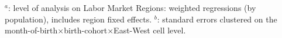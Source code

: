 \begin{landscape}
\begin{table}[htbp]
\begin{minipage}{0.73\linewidth}
		\hspace*{15 pt}$^a$: level of analysis on Labor Market Regions: weighted regressions (by population), includes region fixed effects.\newline
		\hspace*{15 pt}$^b$: standard errors clustered on the month-of-birth$\times$birth-cohort$\times$East-West cell level.
	\end{minipage}
\end{table} 
	\vspace*{\fill}\clearpage
\end{landscape}



